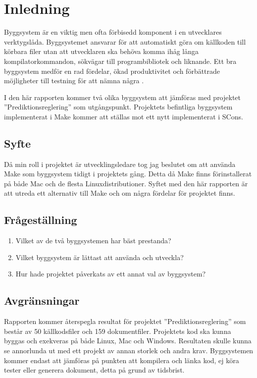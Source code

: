 \section{Inledning}
Byggsystem är en viktig men ofta förbisedd komponent i en utvecklares verktygslåda. Byggsystemet ansvarar för att automatiskt göra om källkoden till körbara filer utan att utvecklaren ska behöva komma ihåg långa kompilatorkommandon, sökvägar till programbibliotek och liknande. Ett bra byggsystem medför en rad fördelar, ökad produktivitet och förbättrade möjligheter till testning för att nämna några \citep{pragmaticautomation}.

I den här rapporten kommer två olika byggsystem att jämföras med projektet ''Prediktionsreglering'' som utgångspunkt. Projektets befintliga byggsystem implementerat i Make kommer att ställas mot ett nytt implementerat i SCons. 

\subsection{Syfte}
Då min roll i projektet är utvecklingsledare tog jag beslutet om att använda Make som byggsystem tidigt i projektets gång. Detta då Make finns förinstallerat på både Mac och de flesta Linuxdistributioner. Syftet med den här rapporten är att utreda ett alternativ till Make och om några fördelar för projektet finns.

\subsection{Frågeställning} \label{avsnitt:fragestallning}

\begin{enumerate}
\item Vilket av de två byggsystemen har bäst prestanda?
\item Vilket byggsystem är lättast att använda och utveckla?
\item Hur hade projektet påverkats av ett annat val av byggsystem?
\end{enumerate}

\subsection{Avgränsningar} \label{avsnitt:avgransningar}
Rapporten kommer återspegla resultat för projektet ''Prediktionsreglering'' som består av 50 källkodsfiler och 159 dokumentfiler. Projektets kod ska kunna byggas och exekveras på både Linux, Mac och Windows. Resultaten skulle kunna se annorlunda ut med ett projekt av annan storlek och andra krav. Byggsystemen kommer endast att jämföras på punkten att kompilera och länka kod, ej köra tester eller generera dokument, detta på grund av tidsbrist.
